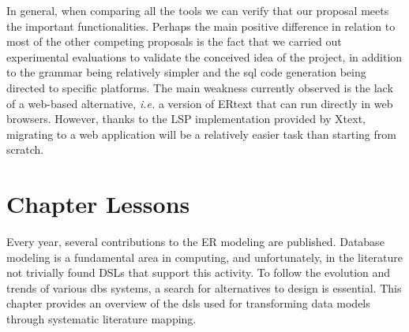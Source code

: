 In general, when comparing all the tools we can verify that our proposal meets the important functionalities.
Perhaps the main positive difference in relation to most of the other competing proposals is the fact that we carried out experimental evaluations to validate the conceived idea of the project, in addition to the grammar being relatively simpler and the \ac{sql} code generation being directed to specific platforms.
The main weakness currently observed is the lack of a web-based alternative, \textit{i.e.} a version of ERtext that can run directly in web browsers.
However, thanks to the LSP implementation provided by Xtext, migrating to a web application will be a relatively easier task than starting from scratch.


\section{Chapter Lessons} \label{sec_slm:lessons}

Every year, several contributions to the ER modeling are published.
Database modeling is a fundamental area in computing, and unfortunately, in the literature not trivially found DSLs that support this activity.
To follow the evolution and trends of various \acp{db} systems, a search for alternatives to design is essential.
This chapter provides an overview of the \acp{dsl} used for transforming data models through systematic literature mapping.

